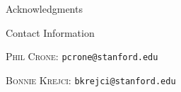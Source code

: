 \documentclass[final]{beamer}
\newlength{\onecolwid}
\begin{document}
\begin{frame}[t]
\begin{columns}[t]
\begin{column}{\onecolwid}
\begin{block}{Acknowledgments}
\end{block}


\begin{alertblock}{Contact Information}

\textsc{Phil Crone}: \texttt{pcrone@stanford.edu}

\textsc{Bonnie Krejci}: \texttt{bkrejci@stanford.edu}

\end{alertblock}

\end{column} %

\end{columns} %

\end{frame} %
\end{document}
